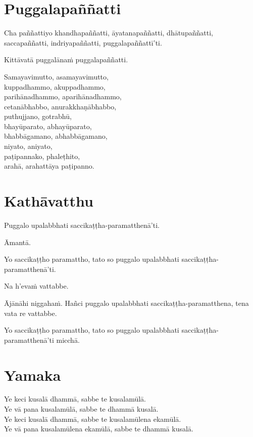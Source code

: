 

\section{Puggalapaññatti}

Cha paññattiyo khandhapaññatti, āyatanapaññatti, dhātupaññatti, saccapaññatti,
indriyapaññatti, puggalapaññattī'ti.

Kittāvatā puggalānaṁ puggalapaññatti.

Samayavimutto, asamayavimutto,\\
kuppadhammo, akuppadhammo,\\
parihānadhammo, aparihānadhammo,\\
cetanābhabbo, anurakkhaṇābhabbo,\\
puthujjano, gotrabhū,\\
bhayūparato, abhayūparato,\\
bhabbāgamano, abhabbāgamano,\\
niyato, aniyato,\\
paṭipannako, phaleṭhito,\\
arahā, arahattāya paṭipanno. 


\section{Kathāvatthu}

Puggalo upalabbhati saccikaṭṭha-paramatthenā'ti.

Āmantā.

Yo saccikaṭṭho paramattho, tato so puggalo upalabbhati
saccikaṭṭha-paramatthenā'ti.

Na h’evaṁ vattabbe.

Ājānāhi niggahaṁ. Hañci puggalo upalabbhati
saccikaṭṭha-paramatthena, tena vata re vattabbe.

Yo saccikaṭṭho paramattho, tato so puggalo upalabbhati
saccikaṭṭha-paramatthenā'ti micchā.



\section{Yamaka}

Ye keci kusalā dhammā, sabbe te kusalamūlā.\\ 
Ye vā pana kusalamūlā, sabbe te dhammā kusalā.\\
Ye keci kusalā dhammā, sabbe te kusalamūlena ekamūlā.\\ 
Ye vā pana kusalamūlena ekamūlā, sabbe te dhammā kusalā.

